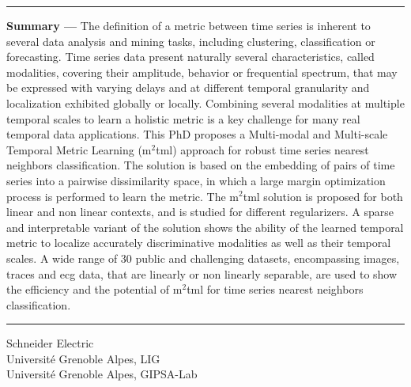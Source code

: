\newpage
\thispagestyle{empty}

\begin{vcenterpage}
\noindent\rule[2pt]{\textwidth}{0.5pt}
{\large\textbf{Summary ---}}
    The definition of a metric between time series is inherent to several data analysis and mining tasks, including clustering, classification or forecasting. Time series data present naturally several characteristics, called modalities, covering their amplitude, behavior or frequential spectrum, that may be expressed with varying delays and at different temporal granularity and localization \textemdash exhibited globally or locally.  Combining several modalities at multiple temporal scales to learn a holistic metric is a key challenge for many real temporal data applications.  This PhD proposes a Multi-modal and Multi-scale Temporal Metric Learning ({\sc m}$^2${\sc tml}) approach for robust time series nearest neighbors classification. The solution is based on the embedding of pairs of time series into a pairwise dissimilarity space, in which a large margin optimization process is performed to learn the metric. The {\sc m}$^2${\sc tml}  solution is proposed for  both linear and non linear contexts, and is studied for different regularizers. A sparse and interpretable variant of the solution  shows the ability of the learned temporal metric to localize accurately discriminative  modalities as well as their temporal scales. 
    A wide range of 30 public and challenging datasets, encompassing images, traces and {\sc ecg} data, that are  linearly or non linearly separable, are used to show the efficiency and the potential of  {\sc m}$^2${\sc tml} for time series nearest neighbors classification.
\\
\noindent\rule[2pt]{\textwidth}{0.5pt}
\begin{center}
	Schneider Electric	\\
	Université Grenoble Alpes, LIG\\
	Université Grenoble Alpes, GIPSA-Lab \\
\end{center}
\end{vcenterpage}

